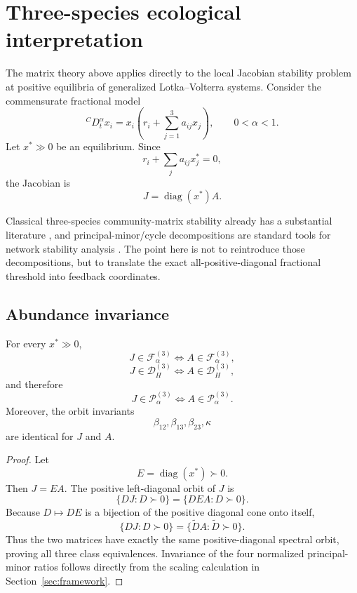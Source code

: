 \section{Three-species ecological interpretation}
\label{sec:ecology}

The matrix theory above applies directly to the local Jacobian stability problem at positive equilibria of generalized Lotka--Volterra systems. Consider the commensurate fractional model
\[
{}^C D_t^\alpha x_i
=
x_i
\left(
r_i+\sum_{j=1}^3 a_{ij}x_j
\right),
\qquad
0<\alpha<1.
\]
Let \(x^*\gg0\) be an equilibrium. Since
\[
r_i+\sum_j a_{ij}x_j^*=0,
\]
the Jacobian is
\[
J
=
\operatorname{diag}(x^*)A.
\]

Classical three-species community-matrix stability already has a substantial literature \citep{ClarkHallam1982}, and principal-minor/cycle decompositions are standard tools for network stability analysis \citep{Kinkhabwala2015}. The point here is not to reintroduce those decompositions, but to translate the exact all-positive-diagonal fractional threshold into feedback coordinates.

\subsection{Abundance invariance}

\begin{proposition}
\label{prop:GLV-invariance}
For every \(x^*\gg0\),
\[
J\in\mathcal F_\alpha^{(3)}
\iff
A\in\mathcal F_\alpha^{(3)},
\]
\[
J\in\mathcal D_H^{(3)}
\iff
A\in\mathcal D_H^{(3)},
\]
and therefore
\[
\boxed{
J\in\mathcal P_\alpha^{(3)}
\iff
A\in\mathcal P_\alpha^{(3)}.
}
\]
Moreover, the orbit invariants
\[
\beta_{12},\beta_{13},\beta_{23},\kappa
\]
are identical for \(J\) and \(A\).
\end{proposition}

\begin{proof}
Let
\[
E=\operatorname{diag}(x^*)\succ0.
\]
Then \(J=EA\). The positive left-diagonal orbit of \(J\) is
\[
\{DJ:D\succ0\}
=
\{DEA:D\succ0\}.
\]
Because \(D\mapsto DE\) is a bijection of the positive diagonal cone onto itself,
\[
\{DJ:D\succ0\}
=
\{\widetilde D A:\widetilde D\succ0\}.
\]
Thus the two matrices have exactly the same positive-diagonal spectral orbit, proving all three class equivalences. Invariance of the four normalized principal-minor ratios follows directly from the scaling calculation in Section~\ref{sec:framework}.
\end{proof}

